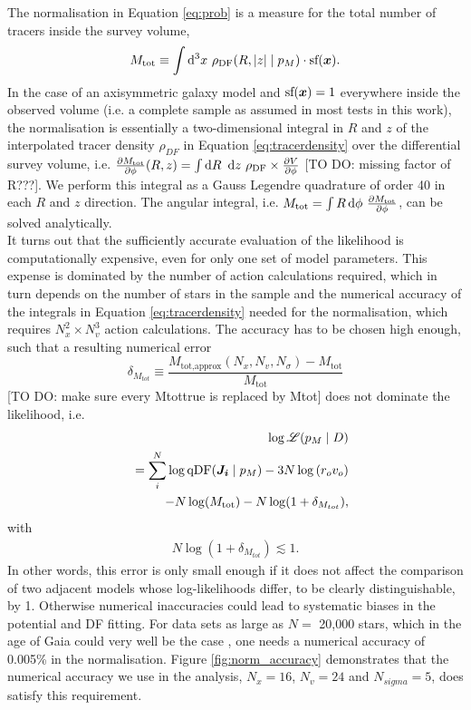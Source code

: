 The normalisation in Equation \ref{eq:prob} is a measure for the total number of tracers inside the survey volume,
\begin{equation}
M_\text{tot} \equiv \int \mathop{}\!\mathrm{d^3} x \  \rho_\text{DF}(R,|z| \mid p_M) \cdot \text{sf}(\boldsymbol{x}).\label{eq:normalisation}
\end{equation}
In the case of an axisymmetric galaxy model and $\text{sf}(\boldsymbol{x})=1$ everywhere inside the observed volume (i.e. a complete sample as assumed in most tests in this work), the normalisation is essentially a two-dimensional integral in $R$ and $z$ of the interpolated tracer density $\rho_{DF}$ in Equation \ref{eq:tracerdensity} over the differential survey volume, i.e. $\frac{\partial M_\text{tot}}{\partial \phi} (R,z) = \int \mathop{}\!\mathrm{d} R \ \mathop{}\!\mathrm{d} z \ \rho_\text{DF} \times \frac{\partial V}{\partial \phi}$ [TO DO: missing factor of R???]. We perform this integral as a Gauss Legendre quadrature of order 40 in each $R$ and $z$ direction. The angular integral, i.e. $M_\text{tot} = \int R \mathop{}\!\mathrm{d} \phi \ \frac{\partial M_\text{tot}}{\partial \phi}$, can be solved analytically. 
\\It turns out that the sufficiently accurate evaluation of the likelihood is computationally expensive, even for only one set of model parameters. This expense is dominated by the number of action calculations required, which in turn depends on the number of stars in the sample and the numerical accuracy of the integrals in Equation \ref{eq:tracerdensity} needed for the normalisation, which requires $N_x^2 \times N_v^3$ action calculations. The accuracy has to be chosen high enough, such that a resulting numerical error 
\begin{equation}
\delta_{M_{tot}} \equiv \frac{M_\text{tot,approx}(N_x,N_v,N_\sigma) -  M_\text{tot} }{M_\text{tot}}\label{eq:relerrlikelihood}
\end{equation}
[TO DO: make sure every Mtottrue is replaced by Mtot]
does not dominate the likelihood, i.e.
\begin{eqnarray}
& &\log \mathscr{L}(p_M \mid D) \nonumber\\
&& = \sum_i^{N} \log \text{qDF}(\boldsymbol{J_i} \mid p_M) - 3N \log \left( r_o v_o\right)\nonumber\\
& & -N \log(M_\text{tot}) - N \log (1 + \delta_{M_{tot}}),\label{eq:loglikelihood_relerr}
\end{eqnarray}
with
\begin{eqnarray}
N \log (1 + \delta_{M_{tot}}) \lesssim 1.\nonumber
\end{eqnarray}
In other words, this error is only small enough if it does not affect the comparison of two adjacent models whose log-likelihoods differ, to be clearly distinguishable, by 1. Otherwise numerical inaccuracies could lead to systematic biases in the potential and DF fitting. For data sets as large as $N =$ 20,000 stars, which in the age of Gaia could very well be the case \HW{[TO DO: Really???]}, one needs a numerical accuracy of 0.005\% in the normalisation. Figure \ref{fig:norm_accuracy} demonstrates that the numerical accuracy we use in the analysis, $N_x=16$, $N_v=24$ and $N_{sigma}=5$, does satisfy this requirement.\\

